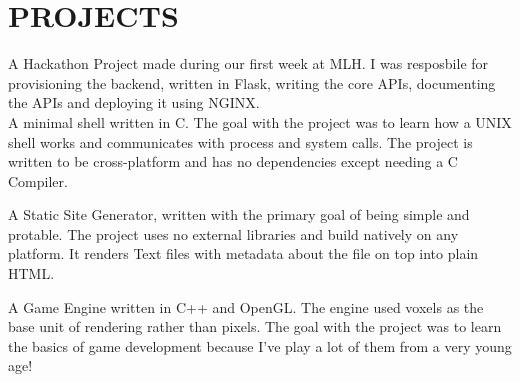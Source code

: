 \documentclass[]{resume-openfont}
\begin{document}
\begin{minipage}[t]{0.66\textwidth}

\section{PROJECTS}

A Hackathon Project made during our first week at MLH. I was resposbile for provisioning the backend, written in Flask, writing the core APIs, documenting the APIs and deploying it using NGINX.\\

\sectionsep
{}
A minimal shell written in C. The goal with the project was to learn how a UNIX shell works and communicates with process and system calls. The project is written to be cross-platform and has no dependencies except needing a C Compiler.\\
\sectionsep

A Static Site Generator, written with the primary goal of being simple and protable. The project uses no external libraries and build natively on any platform. It renders Text files with metadata about the file on top into plain HTML.\\
\sectionsep

A Game Engine written in C++ and OpenGL. The engine used voxels as the base unit of rendering rather than pixels. The goal with the project was to learn the basics of game development because I've play a lot of them from a very young age!\\
\sectionsep

\end{minipage}
\end{document}
